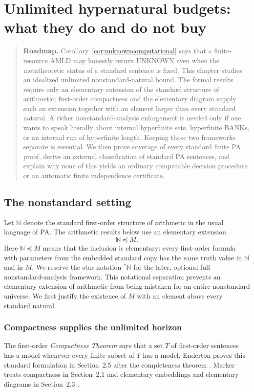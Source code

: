 \documentclass[11pt,openany]{book}
\theoremstyle{definition}
\theoremstyle{remark}
\newenvironment{roadmap}{\begin{quote}\small\color{deepblue}\textbf{Roadmap.} }{\end{quote}}
\newcommand{\N}{\mathbb{N}}
\begin{document}
\chapter{Unlimited hypernatural budgets: what they do and do not buy}\label{ch:hyperbudget}
\begin{roadmap}
Corollary~\ref{cor:unknowncomputational} says that a finite-resource AMLD may honestly return \textsf{UNKNOWN} even when the metatheoretic status of a standard sentence is fixed. This chapter studies an idealized unlimited nonstandard-natural bound. The formal results require only an elementary extension of the standard structure of arithmetic; first-order compactness and the elementary diagram supply such an extension together with an element larger than every standard natural. A richer nonstandard-analysis enlargement is needed only if one wants to speak literally about internal hyperfinite sets, hyperfinite BANKs, or an internal run of hyperfinite length. Keeping those two frameworks separate is essential. We then prove coverage of every standard finite PA proof, derive an external classification of standard PA sentences, and explain why none of this yields an ordinary computable decision procedure or an automatic finite independence certificate.
\end{roadmap}

\section{The nonstandard setting}
Let \(\N\) denote the standard first-order structure of arithmetic in the usual language of PA. The arithmetic results below use an elementary extension
\[
\N\preccurlyeq M.
\]
Here \(\N\preccurlyeq M\) means that the inclusion is elementary: every first-order formula with parameters from the embedded standard copy has the same truth value in \(\N\) and in \(M\). We reserve the star notation \({}^*\N\) for the later, optional full nonstandard-analysis framework. This notational separation prevents an elementary extension of arithmetic from being mistaken for an entire nonstandard universe. We first justify the existence of \(M\) with an element above every standard natural.

\subsection{Compactness supplies the unlimited horizon}\label{sec:compactness-hypernatural}
The first-order \emph{Compactness Theorem} says that a set \(T\) of first-order sentences has a model whenever every finite subset of \(T\) has a model. Enderton proves this standard formulation in Section~2.5 after the completeness theorem \cite{EndertonLogic}. Marker treats compactness in Section~2.1 and elementary embeddings and elementary diagrams in Section~2.3 \cite{MarkerModelTheory}.
\end{document}
